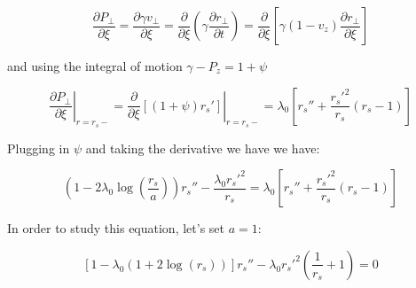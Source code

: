 \documentclass[aps,prl,preprint,groupedaddress]{revtex4-1}
\begin{document}
\begin{equation}\label{eq:track}
\frac{\partial P_{\perp}}{\partial \xi} = \frac{\partial \gamma v_{\perp}}{\partial \xi} =  \frac{\partial}{\partial \xi}\left(\gamma \frac{\partial r_{\perp}}{\partial t}\right) = \frac{\partial}{\partial \xi}\left[\gamma (1-v_z)\frac{\partial r_{\perp}}{\partial \xi}\right]
\end{equation}

and using the integral of motion $\gamma - P_z = 1 + \psi$

\begin{equation}\label{eq:EOM_2}
\left. \frac{\partial P_{\perp}}{\partial \xi}\right|_{r=r_s-} = \left. \frac{\partial}{\partial \xi}[(1+\psi)r_s'] \right|_{r=r_s-}= \lambda_0\left[r_s'' +\frac{r_s'^2}{r_s}(r_s-1)\right]
\end{equation}

Plugging in $\psi$ and taking the derivative we have we have:

\begin{equation}\label{eq:rs}
\left(1-2\lambda_0\log\left(\frac{r_s}{a}\right) \right)r_s'' -\frac{\lambda_0 r_s'^2}{r_s} = \lambda_0\left[r_s'' +\frac{r_s'^2}{r_s}(r_s-1)\right]
\end{equation}

In order to study this equation, let's set $a=1$:

\begin{equation}\label{eq:rs_simp}
[1-\lambda_0(1+2\log(r_s))] r_s'' - \lambda_0 r_s'^2\left(\frac{1}{r_s}+1\right) = 0
\end{equation}


\end{document}
